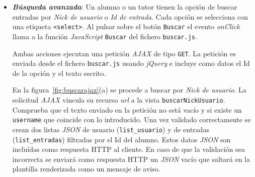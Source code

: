 \documentclass[a4paper, 12pt]{book}
\begin{document}
\begin{itemize}
  \begin{figure}
    \centering
    \caption{\textit{Eliminaci\'on de un alumno en el hilo de un tutor.}}
    \label{fig:eliminaralumno}
  \end{figure}
  
  
  \item {\bfseries \textit{B\'usqueda avanzada}}: Un alumno o un tutor tienen la opci\'on de buscar entradas por \textit{Nick de usuario} o 
  \textit{Id de entrada}. Cada opci\'on se selecciona con una etiqueta \texttt{<select>}. Al pulsar sobre el bot\'on \texttt{Buscar} el evento 
  \textit{onClick} llama a la funci\'on \textit{JavaScript} \texttt{Buscar} del fichero \texttt{buscar.js}. 
  
  Ambas acciones ejecutan una petici\'on \textit{AJAX} de tipo \texttt{GET}. La petici\'on es enviada desde el fichero \texttt{buscar.js} usando 
  \textit{jQuery} e incluye como datos el Id de la opci\'on y el texto escrito.

  En la figura~\ref{fig:buscarajax}(a) se procede a buscar por \textit{Nick de usuario}. La solicitud \textit{AJAX} vincula su recurso \textit{url} a la 
  vista \texttt{buscarNickUsuario}. Comprueba que el texto enviado en la petici\'on no est\'a vac\'io y si existe un \texttt{username} que coincide con lo
  introducido. Una vez validado correctamente se crean dos listas \textit{JSON} de usuario (\texttt{list\_usuario}) y de entradas (\texttt{list\_entradas}) 
  filtradas por el Id del alumno. Estos datos \textit{JSON} son inclu\'idas como respuesta HTTP al cliente. En caso de que la validaci\'on sea incorrecta 
  se enviar\'a como respuesta HTTP un \textit{JSON} vac\'io que saltar\'a en la plantilla renderizada como un mensaje de aviso.


\end{itemize}
\end{document}
